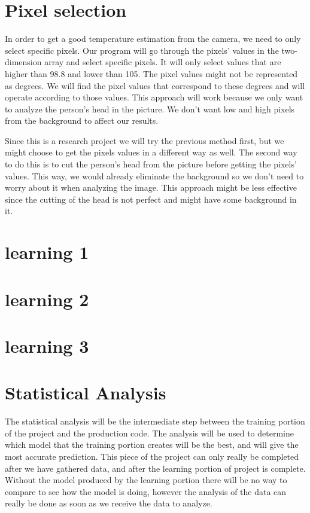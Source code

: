 \documentclass[onecolumn, draftclsnofoot,10pt, compsoc]{IEEEtran}
\begin{document}
\section{Pixel selection}
In order to get a good temperature estimation from the camera, we need to only select specific pixels. Our program will go through the pixels’ values in the two-dimension array and select specific pixels. It will only select values that are higher than 98.8 and lower than 105. The pixel values might not be represented as degrees. We will find the pixel values that correspond to these degrees and will operate according to those values. This approach will work because we only want to analyze the person’s head in the picture. We don’t want low and high pixels from the background to affect our results. 

Since this is a research project we will try the previous method first, but we might choose to get the pixels values in a different way as well. The second way to do this is to cut the person’s head from the picture before getting the pixels’ values. This way, we would already eliminate the background so we don’t need to worry about it when analyzing the image. This approach might be less effective since the cutting of the head is not perfect and might have some background in it. 


\section{learning 1}
\section{learning 2}
\section{learning 3}
\section{Statistical Analysis}
The statistical analysis will be the intermediate step between the training portion of the project and the production code. The analysis will be used to determine which model that the training portion creates will be the best, and will give the most accurate prediction. This piece of the project can only really be completed after we have gathered data, and after the learning portion of project is complete. Without the model produced by the learning portion there will be no way to compare to see how the model is doing, however the analysis of the data can really be done as soon as we receive the data to analyze.
\end{document}
